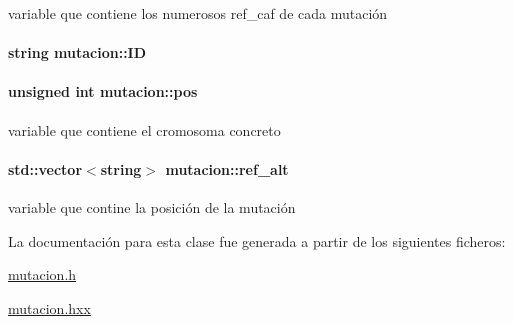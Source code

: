 variable que contiene los numerosos ref\+\_\+caf de cada mutación 

\paragraph[{\texorpdfstring{ID}{ID}}]{\setlength{\rightskip}{0pt plus 5cm}string mutacion\+::\+ID\hspace{0.3cm}{\ttfamily [private]}}\hypertarget{classmutacion_aafc39218473e0f21eb0c3dc05dd4f35e}{}\label{classmutacion_aafc39218473e0f21eb0c3dc05dd4f35e}
\paragraph[{\texorpdfstring{pos}{pos}}]{\setlength{\rightskip}{0pt plus 5cm}unsigned int mutacion\+::pos\hspace{0.3cm}{\ttfamily [private]}}\hypertarget{classmutacion_ae1487b8648d0eaad68de5e4e5a87f3ff}{}\label{classmutacion_ae1487b8648d0eaad68de5e4e5a87f3ff}


variable que contiene el cromosoma concreto 

\paragraph[{\texorpdfstring{ref\+\_\+alt}{ref_alt}}]{\setlength{\rightskip}{0pt plus 5cm}std\+::vector$<$string$>$ mutacion\+::ref\+\_\+alt\hspace{0.3cm}{\ttfamily [private]}}\hypertarget{classmutacion_a2b3d0ed7547618562fae965d373b39e3}{}\label{classmutacion_a2b3d0ed7547618562fae965d373b39e3}


variable que contine la posición de la mutación 



La documentación para esta clase fue generada a partir de los siguientes ficheros\+:\begin{DoxyCompactItemize}
\item 
\hyperlink{mutacion_8h}{mutacion.\+h}\item 
\hyperlink{mutacion_8hxx}{mutacion.\+hxx}\end{DoxyCompactItemize}
